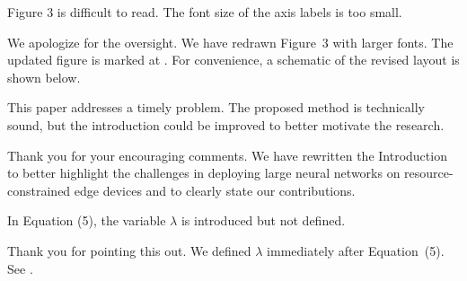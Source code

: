 \documentclass{ar2rc}
\begin{document}
\begin{reviewerblock}
\begin{reviewercomment}
\label{com1.2}
  Figure 3 is difficult to read. The font size of the axis labels is too small.
\end{reviewercomment}
\begin{reviewerresponse}
  We apologize for the oversight. We have redrawn Figure~3 with larger fonts.
  The updated figure is marked at . For convenience, a schematic of
  the revised layout is shown below.

  \begin{center}
    \label{fig:demo-fig3}
  \end{center}
\end{reviewerresponse}
\end{reviewerblock}

\resetcommentcounter

\begin{generalblock}
\begin{generalcomment}
\label{com2.0}
This paper addresses a timely problem. The proposed method is technically sound,
but the introduction could be improved to better motivate the research.
\end{generalcomment}
\begin{generalresponse}
Thank you for your encouraging comments. We have rewritten the Introduction to
better highlight the challenges in deploying large neural networks on
resource-constrained edge devices and to clearly state our contributions.
\end{generalresponse}
\end{generalblock}

\begin{reviewerblock}
\begin{reviewercomment}
\label{com2.1}
In Equation (5), the variable $\lambda$ is introduced but not defined.
\end{reviewercomment}
\begin{reviewerresponse}
Thank you for pointing this out. We defined $\lambda$ immediately after
Equation~(5). See .
\end{reviewerresponse}
\end{reviewerblock}
\end{document}
